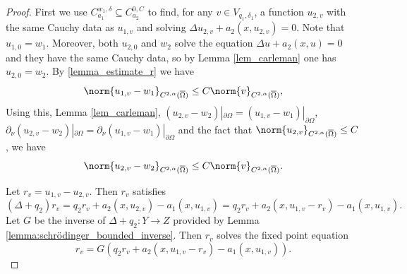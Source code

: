 \documentclass[11pt,a4paper]{amsart}
\theoremstyle{definition}
\numberwithin{equation}{section}
\newcommand{\ol}[1]{\overline{#1}}
\newcommand{\p}{\partial}
\newcommand{\Om}{\Omega}
\begin{document}
\begin{proof}
First we use $C_{a_1}^{w_1,\delta} \subseteq C_{a_2}^{0,C}$ to find, for any $v \in V_{q_1,\delta_1}$, a function $u_{2,v}$ with the same Cauchy data as $u_{1,v}$ and solving $\Delta u_{2,v} + a_2(x,u_{2,v}) = 0$.
Note that $u_{1,0} = w_1$.
Moreover, both $u_{2,0}$ and $w_2$ solve the equation $\Delta u + a_2(x,u) = 0$ and they have the same Cauchy data, so by Lemma \ref{lem_carleman} one has $u_{2,0} = w_2$. By \eqref{lemma_estimate_r} we have 
\begin{equation} \label{uvw_diff_first}
\norm{u_{1,v}-w_1}_{C^{2,\alpha}(\ol{\Om})} \leq C \norm{v}_{C^{2,\alpha}(\ol{\Om})},
\end{equation}
Using this, Lemma \ref{lem_carleman}, $(u_{2,v}-w_2)|_{\p\Om}=(u_{1,v}-w_1)|_{\p\Om}$, $\p_{\nu}(u_{2,v}-w_2)|_{\p\Om}=\p_{\nu}(u_{1,v}-w_1)|_{\p\Om}$ and the fact that $\norm{u_{2,v}}_{C^{2,\alpha}(\ol{\Om})} \leq C$, we have 
\begin{equation} \label{uvw_diff_second}
\norm{u_{2,v}-w_2}_{C^{2,\alpha}(\ol{\Om})} \leq C \norm{v}_{C^{2,\alpha}(\ol{\Om})}.
\end{equation}

 
Let $r_v = u_{1,v}-u_{2,v}$.
Then $r_v$ satisfies
\begin{equation*}
	(\Delta+q_2) r_{v} = q_2r_{v} + a_2(x,u_{2,v}) - a_1(x,u_{1,v}) = q_2r_{v} + a_2(x,u_{1,v} - r_{v}) - a_1(x,u_{1,v}).
\end{equation*}
Let $G$ be the inverse of $\Delta +q_2: Y \to Z$ provided by Lemma \ref{lemma:schrödinger_bounded_inverse}.
Then $r_v$ solves the fixed point equation 
\begin{equation} \label{rv_eq}
	r_v = G(q_2r_{v} + a_2(x,u_{1,v} - r_{v}) - a_1(x,u_{1,v})).
\end{equation}


\end{proof}
\end{document}

